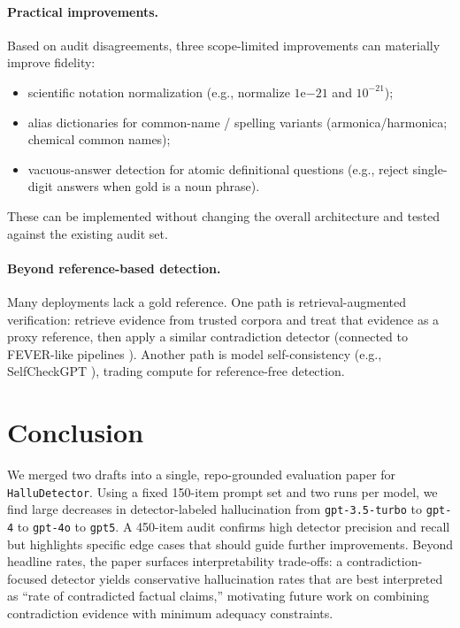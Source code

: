 \documentclass[11pt]{article}
\newcommand{\model}[1]{\texttt{#1}}
\newcommand{\dataset}{\texttt{HalluDetector}}
\begin{document}
\paragraph{Practical improvements.}
Based on audit disagreements, three scope-limited improvements can materially improve fidelity:
\begin{itemize}[leftmargin=1.4em]
  \item scientific notation normalization (e.g., normalize \(1\mathrm{e}{-21}\) and \(10^{-21}\));
  \item alias dictionaries for common-name / spelling variants (armonica/harmonica; chemical common names);
  \item vacuous-answer detection for atomic definitional questions (e.g., reject single-digit answers when gold is a noun phrase).
\end{itemize}
These can be implemented without changing the overall architecture and tested against the existing audit set.

\paragraph{Beyond reference-based detection.}
Many deployments lack a gold reference. One path is retrieval-augmented verification: retrieve evidence from trusted corpora and treat that evidence as a proxy reference, then apply a similar contradiction detector (connected to FEVER-like pipelines \cite{thorne2018fever}). Another path is model self-consistency (e.g., SelfCheckGPT \cite{manakul2023selfcheck}), trading compute for reference-free detection.

\section{Conclusion}
We merged two drafts into a single, repo-grounded evaluation paper for \dataset. Using a fixed 150-item prompt set and two runs per model, we find large decreases in detector-labeled hallucination from \model{gpt-3.5-turbo} to \model{gpt-4} to \model{gpt-4o} to \model{gpt5}. A 450-item audit confirms high detector precision and recall but highlights specific edge cases that should guide further improvements. Beyond headline rates, the paper surfaces interpretability trade-offs: a contradiction-focused detector yields conservative hallucination rates that are best interpreted as ``rate of contradicted factual claims,'' motivating future work on combining contradiction evidence with minimum adequacy constraints.
\end{document}
